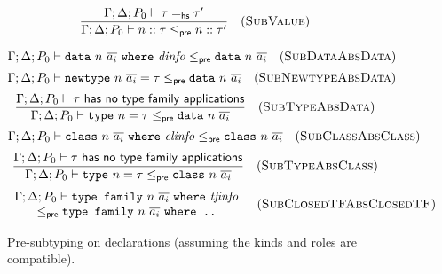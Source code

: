 \begin{figure}
\[
\frac{
\Gamma; \Delta; P_0 \vdash \tau =_\textsf{hs} \tau'
}{
\Gamma; \Delta; P_0 \vdash n :: \tau \le_\textsf{pre} n :: \tau'
}
\quad(\textsc{SubValue})
\]


\begin{mdframed}
\[
\Gamma; \Delta; P_0 \vdash \texttt{data}~n~\overline{a_i} ~\texttt{where}~ \mathit{dinfo} \le_\textsf{pre} \texttt{data}~n~\overline{a_i}
\quad(\textsc{SubDataAbsData})
\]
\[
\Gamma; \Delta; P_0 \vdash \texttt{newtype}~n~\overline{a_i} = \tau \le_\textsf{pre} \texttt{data}~n~\overline{a_i}
\quad(\textsc{SubNewtypeAbsData})
\]
\[
\frac{
\Gamma; \Delta; P_0 \vdash \tau ~\textsf{has no type family applications}
}{
\Gamma; \Delta; P_0 \vdash \texttt{type}~n = \tau \le_\textsf{pre} \texttt{data}~n~\overline{a_i}
}
\quad(\textsc{SubTypeAbsData})
\]
\[
\Gamma; \Delta; P_0 \vdash \texttt{class}~n~\overline{a_i}~\texttt{where}~ \mathit{clinfo} \le_\textsf{pre} \texttt{class}~n~\overline{a_i}
\quad(\textsc{SubClassAbsClass})
\]
\[
\frac{
\Gamma; \Delta; P_0 \vdash \tau ~\textsf{has no type family applications}
}{
\Gamma; \Delta; P_0 \vdash \texttt{type}~n = \tau \le_\textsf{pre} \texttt{class}~n~\overline{a_i}
}
\quad(\textsc{SubTypeAbsClass})
\]
\[
\begin{array}{c}
\Gamma; \Delta; P_0 \vdash \texttt{type family}~n~\overline{a_i} ~\texttt{where}~ \mathit{tfinfo} \\
\le_\textsf{pre} \texttt{type family}~n~\overline{a_i} ~\texttt{where ..}
\end{array}
\quad(\textsc{SubClosedTFAbsClosedTF})
\]
\end{mdframed}
\caption{Pre-subtyping on declarations (assuming the kinds and roles are compatible).}
\label{typing:subtyping}
\end{figure}
